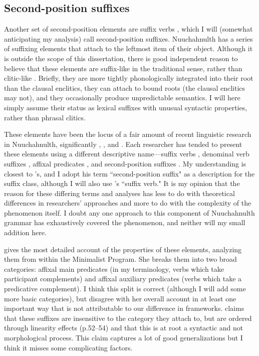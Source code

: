 \subsection{Second-position suffixes} \label{ch:clause:2pv}

Another set of second-position elements are suffix verbs \citep{kammler96-14}, which I will (somewhat anticipating my analysis) call second-position suffixes. Nuuchahnulth has a series of suffixing elements that attach to the leftmost item of their object. Although it is outside the scope of this dissertation, there is good independent reason to believe that these elements are suffix-like in the traditional sense, rather than clitic-like \citep{werle2007b}. Briefly, they are more tightly phonologically integrated into their root than the clausal enclitics, they can attach to bound roots (the clausal enclitics may not), and they occasionally produce unpredictable semantics. I will here simply assume their status as lexical suffixes with unusual syntactic properties, rather than phrasal clitics.

These elements have been the locus of a fair amount of recent linguistic research in Nuuchahnulth, significantly \citet{waldie2004}, \citet{wojdak2005, wojdak2007}, and \citet{woo2007b}. Each researcher has tended to present these elements using a different descriptive name---suffix verbs \citep{kammler96-14}, denominal verb suffixes \citep{waldie2004}, affixal predicates \citep{wojdak2005, wojdak2007}, and second-position suffixes \citep{werle2007b}. My understanding is closest to \citeauthor{werle2007b}'s, and I adopt his term ``second-position suffix" as a description for the suffix class, although I will also use \citeauthor{kammler96-14}'s ``suffix verb." It is my opinion that the reason for these differing terms and analyses has less to do with theoretical differences in researchers' approaches and more to do with the complexity of the phenomenon itself. I doubt any one approach to this component of Nuuchahnulth grammar has exhaustively covered the phenomenon, and neither will my small addition here.

\citet{wojdak2005, wojdak2007} gives the most detailed account of the properties of these elements, analyzing them from within the Minimalist Program. She breaks them into two broad categories: affixal main predicates (in my terminology, verbs which take participant complements) and affixal auxiliary predicates (verbs which take a predicative complement). I think this split is correct (although I will add some more basic categories), but disagree with her overall account in at least one important way that is not attributable to our difference in frameworks. \citeauthor{wojdak2005} claims that these suffixes are insensitive to the category they attach to, but are ordered through linearity effects (p.52--54) and that this is at root a syntactic and not morphological process. This claim captures a lot of good generalizations but I think it misses some complicating factors.

